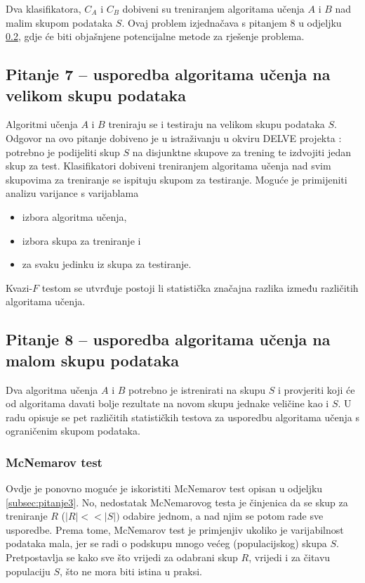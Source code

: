 Dva klasifikatora, $C_A$ i $C_B$ dobiveni su treniranjem algoritama učenja $A$ i $B$ nad malim skupom podataka $S$. Ovaj problem \citep{dietterich1998approximate} izjednačava s pitanjem 8 u odjeljku \ref{subsec:pitanje8}, gdje će biti objašnjene potencijalne metode za rješenje problema. 

\subsection{Pitanje 7 -- usporedba algoritama učenja na velikom skupu podataka}

Algoritmi učenja $A$ i $B$ treniraju se i testiraju na velikom skupu podataka $S$. Odgovor na ovo pitanje dobiveno je u istraživanju u okviru DELVE projekta \citep{hintondelve}: potrebno je podijeliti skup $S$ na disjunktne skupove za trening te izdvojiti jedan skup za test. Klasifikatori dobiveni treniranjem algoritama učenja nad svim skupovima za treniranje se ispituju skupom za testiranje. Moguće je primijeniti analizu varijance s varijablama \begin{itemize}
\item izbora algoritma učenja,
\item izbora skupa za treniranje i 
\item za svaku jedinku iz skupa za testiranje.
\end{itemize}
Kvazi-$F$ testom \citep{eisen1966225} se utvrđuje postoji li statistička značajna razlika između različitih algoritama učenja.

\subsection{Pitanje 8 -- usporedba algoritama učenja na malom skupu podataka}
\label{subsec:pitanje8}

Dva algoritma učenja $A$ i $B$ potrebno je istrenirati na skupu $S$ i provjeriti koji će od algoritama davati bolje rezultate na novom skupu jednake veličine kao i $S$. U radu \citep{dietterich1998approximate} opisuje se pet različitih statističkih testova za usporedbu algoritama učenja s ograničenim skupom podataka. 

\subsubsection{McNemarov test}

Ovdje je ponovno moguće je iskoristiti McNemarov test opisan u odjeljku \ref{subsec:pitanje3}. No, nedostatak McNemarovog testa je činjenica da se skup za treniranje $R$ ($|R| << |S|)$ odabire jednom, a nad njim se potom rade sve usporedbe. Prema tome, McNemarov test je primjenjiv ukoliko je varijabilnost podataka mala, jer se radi o podskupu mnogo većeg (populacijskog) skupa $S$. Pretpostavlja se kako sve što vrijedi za odabrani skup $R$, vrijedi i za čitavu populaciju $S$, što ne mora biti istina u praksi. 

